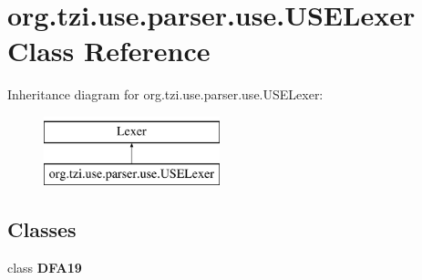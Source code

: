 \hypertarget{classorg_1_1tzi_1_1use_1_1parser_1_1use_1_1_u_s_e_lexer}{\section{org.\-tzi.\-use.\-parser.\-use.\-U\-S\-E\-Lexer Class Reference}
\label{classorg_1_1tzi_1_1use_1_1parser_1_1use_1_1_u_s_e_lexer}
}
Inheritance diagram for org.\-tzi.\-use.\-parser.\-use.\-U\-S\-E\-Lexer\-:\begin{figure}[H]
\begin{center}
\leavevmode
\includegraphics[height=2.000000cm]{classorg_1_1tzi_1_1use_1_1parser_1_1use_1_1_u_s_e_lexer}
\end{center}
\end{figure}
\subsection*{Classes}
\begin{DoxyCompactItemize}
\item 
class {\bfseries D\-F\-A19}
\end{DoxyCompactItemize}
